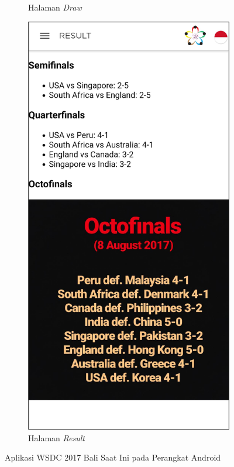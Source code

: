 \begin{figure}[H]
\begin{subfigure}[b]{0.247\textwidth}
	    \caption{Halaman {\it Draw}}
	    \label{fig:wsdcAppDraw}
     \end{subfigure}
	\begin{subfigure}[b]{0.247\textwidth}
    \centering
	    \includegraphics[scale=0.4]{Gambar/ResultPage.png}
	    \caption{Halaman {\it Result}}
	    \label{fig:wsdcAppResult}
     \end{subfigure}
	\caption{Aplikasi WSDC 2017 Bali Saat Ini pada Perangkat Android}
        \label{fig:three graphs}
\end{figure}



